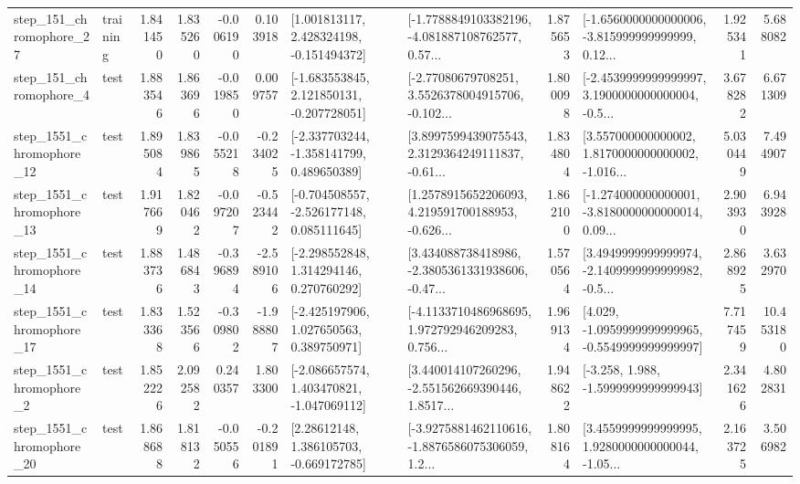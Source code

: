 \begin{tabular}{llrrrrllrlrr}
  step\_151\_chromophore\_27 &  training &      1.841450 &    1.835260 &     -0.006190 &  0.103918 &    [1.001813117, 2.428324198, -0.151494372] &  [-1.7788849103382196, -4.081887108762577, 0.57... &       1.875653 &  [-1.6560000000000006, -3.815999999999999, 0.12... &            1.925341 &          5.688082 \\
   step\_151\_chromophore\_4 &      test &      1.883546 &    1.863696 &     -0.019850 &  0.009757 &   [-1.683553845, 2.121850131, -0.207728051] &  [-2.77080679708251, 3.5526378004915706, -0.102... &       1.800098 &  [-2.4539999999999997, 3.1900000000000004, -0.5... &            3.678282 &          6.671309 \\
 step\_1551\_chromophore\_12 &      test &      1.895084 &    1.839865 &     -0.055218 & -0.234025 &   [-2.337703244, -1.358141799, 0.489650389] &  [3.8997599439075543, 2.3129364249111837, -0.61... &       1.834804 &  [3.557000000000002, 1.8170000000000002, -1.016... &            5.030449 &          7.494907 \\
 step\_1551\_chromophore\_13 &      test &      1.917669 &    1.820462 &     -0.097207 & -0.523442 &   [-0.704508557, -2.526177148, 0.085111645] &  [1.2578915652206093, 4.219591700188953, -0.626... &       1.862100 &  [-1.274000000000001, -3.8180000000000014, 0.09... &            2.903930 &          6.943928 \\
 step\_1551\_chromophore\_14 &      test &      1.883736 &    1.486843 &     -0.396894 & -2.589106 &    [-2.298552848, 1.314294146, 0.270760292] &  [3.434088738418986, -2.3805361331938606, -0.47... &       1.570564 &  [3.4949999999999974, -2.1409999999999982, -0.5... &            2.868925 &          3.632970 \\
 step\_1551\_chromophore\_17 &      test &      1.833368 &    1.523566 &     -0.309802 & -1.988807 &    [-2.425197906, 1.027650563, 0.389750971] &  [-4.1133710486968695, 1.972792946209283, 0.756... &       1.969134 &  [4.029, -1.0959999999999965, -0.5549999999999997] &            7.717459 &         10.453180 \\
  step\_1551\_chromophore\_2 &      test &      1.852226 &    2.092582 &      0.240357 &  1.803300 &   [-2.086657574, 1.403470821, -1.047069112] &  [3.440014107260296, -2.551562669390446, 1.8517... &       1.948622 &               [-3.258, 1.988, -1.5999999999999943] &            2.341626 &          4.802831 \\
 step\_1551\_chromophore\_20 &      test &      1.868688 &    1.818132 &     -0.050556 & -0.201891 &     [2.28612148, 1.386105703, -0.669172785] &  [-3.9275881462110616, -1.8876586075306059, 1.2... &       1.808164 &  [3.4559999999999995, 1.9280000000000044, -1.05... &            2.163725 &          3.506982 \\

\end{tabular}
